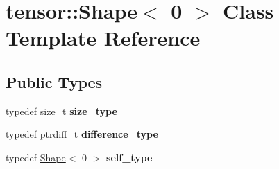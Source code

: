 \hypertarget{classtensor_1_1Shape_3_010_01_4}{}\section{tensor\+:\+:Shape$<$ 0 $>$ Class Template Reference}
\label{classtensor_1_1Shape_3_010_01_4}
\subsection*{Public Types}
\begin{DoxyCompactItemize}
\item 
typedef size\+\_\+t {\bfseries size\+\_\+type}\hypertarget{classtensor_1_1Shape_3_010_01_4_aa6971b8d13fb21ce5a31751b9c8c37fb}{}\label{classtensor_1_1Shape_3_010_01_4_aa6971b8d13fb21ce5a31751b9c8c37fb}

\item 
typedef ptrdiff\+\_\+t {\bfseries difference\+\_\+type}\hypertarget{classtensor_1_1Shape_3_010_01_4_a96dd3e0fcba05deee2afbf2b7b93c874}{}\label{classtensor_1_1Shape_3_010_01_4_a96dd3e0fcba05deee2afbf2b7b93c874}

\item 
typedef \hyperlink{classtensor_1_1Shape}{Shape}$<$ 0 $>$ {\bfseries self\+\_\+type}\hypertarget{classtensor_1_1Shape_3_010_01_4_a51707d9bc620f1b2f42e45a5367d4b04}{}\label{classtensor_1_1Shape_3_010_01_4_a51707d9bc620f1b2f42e45a5367d4b04}

\end{DoxyCompactItemize}
